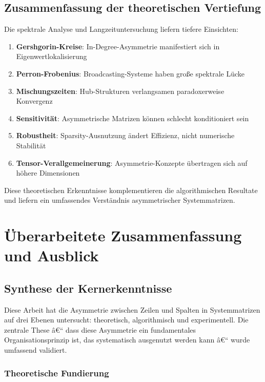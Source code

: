 ﻿\documentclass[a4paper,12pt]{report}
\theoremstyle{definition}
\begin{document}
	\section{Zusammenfassung der theoretischen Vertiefung}
	
	Die spektrale Analyse und Langzeituntersuchung liefern tiefere Einsichten:
	
	\begin{enumerate}
		\item \textbf{Gershgorin-Kreise}: In-Degree-Asymmetrie manifestiert sich in Eigenwertlokalisierung
		\item \textbf{Perron-Frobenius}: Broadcasting-Systeme haben große spektrale Lücke
		\item \textbf{Mischungszeiten}: Hub-Strukturen verlangsamen paradoxerweise Konvergenz
		\item \textbf{Sensitivität}: Asymmetrische Matrizen können schlecht konditioniert sein
		\item \textbf{Robustheit}: Sparsity-Ausnutzung ändert Effizienz, nicht numerische Stabilität
		\item \textbf{Tensor-Verallgemeinerung}: Asymmetrie-Konzepte übertragen sich auf höhere Dimensionen
	\end{enumerate}
	
	Diese theoretischen Erkenntnisse komplementieren die algorithmischen Resultate und liefern ein umfassendes Verständnis asymmetrischer Systemmatrizen.
	
	\chapter{Überarbeitete Zusammenfassung und Ausblick}
	
	\section{Synthese der Kernerkenntnisse}
	
	Diese Arbeit hat die Asymmetrie zwischen Zeilen und Spalten in Systemmatrizen auf drei Ebenen untersucht: theoretisch, algorithmisch und experimentell. Die zentrale These â€“ dass diese Asymmetrie ein fundamentales Organisationsprinzip ist, das systematisch ausgenutzt werden kann â€“ wurde umfassend validiert.
	
	\subsection{Theoretische Fundierung}
	
\end{document}
